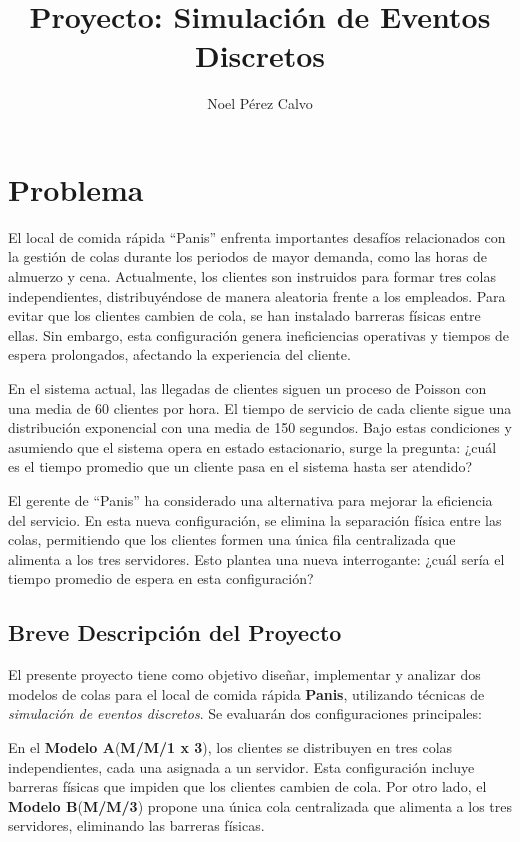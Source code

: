 \documentclass[a4paper,12pt]{article}
\title{Proyecto: Simulación de Eventos Discretos}
\author{Noel Pérez Calvo}
\begin{document}
\maketitle

\newpage

\tableofcontents
\newpage

\section{Problema}

El local de comida rápida “Panis” enfrenta importantes desafíos relacionados con la gestión de colas durante los periodos de mayor demanda, como las horas de almuerzo y cena. Actualmente, los clientes son instruidos para formar tres colas independientes, distribuyéndose de manera aleatoria frente a los empleados. Para evitar que los clientes cambien de cola, se han instalado barreras físicas entre ellas. Sin embargo, esta configuración genera ineficiencias operativas y tiempos de espera prolongados, afectando la experiencia del cliente.

En el sistema actual, las llegadas de clientes siguen un proceso de Poisson con una media de 60 clientes por hora. El tiempo de servicio de cada cliente sigue una distribución exponencial con una media de 150 segundos. Bajo estas condiciones y asumiendo que el sistema opera en estado estacionario, surge la pregunta: ¿cuál es el tiempo promedio que un cliente pasa en el sistema hasta ser atendido?

El gerente de “Panis” ha considerado una alternativa para mejorar la eficiencia del servicio. En esta nueva configuración, se elimina la separación física entre las colas, permitiendo que los clientes formen una única fila centralizada que alimenta a los tres servidores. Esto plantea una nueva interrogante: ¿cuál sería el tiempo promedio de espera en esta configuración?

\subsection{Breve Descripción del Proyecto}

El presente proyecto tiene como objetivo diseñar, implementar y analizar dos modelos de colas para el local de comida rápida \textbf{Panis}, utilizando técnicas de \textit{simulación de eventos discretos}. Se evaluarán dos configuraciones principales:

En el \textbf{Modelo A}(\textbf{M/M/1 x 3}), los clientes se distribuyen en tres colas independientes, cada una asignada a un servidor. Esta configuración incluye barreras físicas que impiden que los clientes cambien de cola. Por otro lado, el \textbf{Modelo B}(\textbf{M/M/3}) propone una única cola centralizada que alimenta a los tres servidores, eliminando las barreras físicas.
\end{document}

